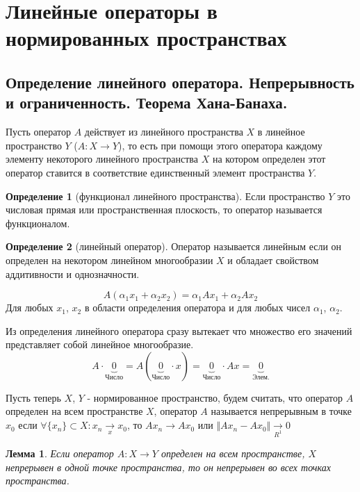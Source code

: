 \documentclass[14pt,a4paper]{extarticle}
\newtheorem{lemma}{Лемма}[section]
\theoremstyle{definition}
\newtheorem{definition}{Определение}[section]
\theoremstyle{remark}
\renewcommand{\[}{\begin{dmath*}[compact]}
\renewcommand{\]}{\end{dmath*}}
\begin{document}
\section{Линейные операторы в нормированных пространствах}

\subsection{Определение линейного оператора. Непрерывность и ограниченность.
Теорема Хана-Банаха.}

Пусть оператор $A$ действует из линейного пространства $X$ в
линейное пространство $Y$ ($A: X \to Y$), то есть при помощи этого оператора
каждому элементу некоторого линейного пространства $X$ на котором определен
этот оператор ставится в соответствие единственный элемент пространства $Y$.

\begin{definition}[функционал линейного пространства]
  Если пространство $Y$ это числовая прямая или пространственная плоскость,
  то оператор называется функционалом.
\end{definition}

\begin{definition}[линейный оператор]
  Оператор называется линейным если он определен на некотором
  линейном многообразии $X$ и обладает свойством аддитивности и однозначности.
\end{definition}

\[A(\alpha_1x_1 + \alpha_2x_2) = \alpha_1Ax_1 + \alpha_2Ax_2\]
Для любых $x_1$, $x_2$ в области определения оператора и для любых чисел
$\alpha_1$, $\alpha_2$.

Из определения линейного оператора сразу вытекает что множество его значений
представляет собой линейное многообразие.
\[A \cdot \underbrace{0}_{\text{Число}} =
A (\underbrace{0}_{\text{Число}} \cdot x) =
\underbrace{0}_{\text{Число}} \cdot Ax = \underbrace{0}_{\text{Элем.}}\]

Пусть теперь $X$, $Y$ - нормированное пространство, будем считать, что оператор
$A$ определен на всем пространстве $X$, оператор $A$ называется непрерывным
в точке $x_0$ если
$ \forall \{x_n\} \subset X: x_n \underset{x}{\to} x_0 $,
то $Ax_n \to Ax_0$ или  $\Vert Ax_n - A x_0 \Vert \underset{R^1}{\to}0$

\begin{lemma}
  Если оператор $A: X \to Y$ определен на всем пространстве,
  $X$ непрерывен в одной точке пространства,
  то он непрерывен во всех точках пространства.
\end{lemma}
\end{document}
